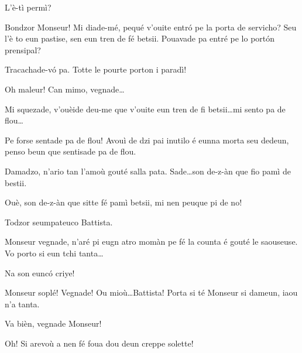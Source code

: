 \begin{drama}


\Preyespeaks L’è-tì permì? 

\Cesarspeaks  Bondzor Monseur! Mi diade-mé, pequé v'ouite entr\'o pe la porta de servicho? Seu l'è to eun pastise, sen eun tren de fé betsii. Pouavade pa entré pe lo port\'on prensipal?

\Preyespeaks Tracachade-v\'o pa. Totte le pourte porton i paradì!

\Cesarspeaks{} Oh maleur! Can mimo, vegnade\ldots

\Preyespeaks{} Mi squezade, v'ouèide deu-me que v'ouite eun tren de fi betsii\ldots mi sento pa de flou\ldots

\Hermannspeaks{} Pe forse sentade pa de flou! Avouì de dzi pai inutilo é eunna morta seu dedeun, penso beun que sentisade pa de flou.

\Preyespeaks Damadzo, n’ario tan l'amoù gouté salla pata. Sade\ldots son de-z-àn que fio pamì de bestii.

\Battistaspeaks  Ouè, son de-z-àn que sitte fé pamì betsii, mi nen peuque pi de no! 


\Preyespeaks{} Todzor seumpateuco Battista.

\Cesarspeaks  Monseur vegnade, n’aré pi eugn atro momàn pe fé la counta é gouté le saouseuse. Vo porto si eun tchi tanta\ldots


\Preyespeaks Na son eunc\'o criye!

\Cesarspeaks Monseur soplé! Vegnade! Ou mioù\ldots Battista! Porta si té Monseur si dameun, iaou n'a tanta.

\Battistaspeaks Va bièn, vegnade Monseur!

\Cesarspeaks Oh! Si arevoù a nen fé foua dou deun creppe solette!


\ridocliou

\scene[-- La mii? ]



\end{drama}
